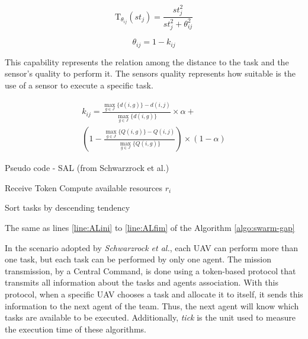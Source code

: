 \begin{equation} \label{eq:tendencia}
	\textrm{T}_{\theta_{ij}}(st_j) = \frac{st_{j}^2}{st_{j}^2 + \theta_{ij}^2}
\end{equation}

\begin{equation} \label{eq:limiar}
	\theta_{ij} = 1 - k_{ij}
\end{equation}

This capability represents the relation among the distance to the task and the sensor's quality to perform it. The sensors quality represents how suitable is the use of a sensor to execute a specific task.

\begin{equation} \label{eq:capability}
\begin{split}
k_{ij} = \frac{\max_{g \in J} \{d(i,g)\} - d(i,j)}{\max_{g \in J} \{d(i,g)\}} \times \alpha + \\
(1 - \frac{\max_{g \in J} \{Q(i,g)\} - Q(i,j)}{\max_{g \in J} \{Q(i,g)\}}) \times (1-\alpha)
\end{split}
\end{equation}

\begin{algorithm}[h!t]
	\caption{Pseudo code - SAL (from Schwarzrock et al.\cite{MAS07})}
	\label{algo:swarm-gap2}
	
	\SetAlgoLined
	\DontPrintSemicolon
	
	\SetNlSkip{0.3em}
	
	Receive Token\;
	Compute available resources $r_i $ \; \label{line:compute_rALA}
	
	Sort tasks by descending tendency\; \label{line:sortbyTend}
	
	
	The same as lines \ref{line:ALini} to \ref{line:ALfim} of the Algorithm \ref{algo:swarm-gap} \;
	
\end{algorithm}

In the scenario adopted by \textit{Schwarzrock et al.}\cite{MAS07}, each UAV can perform more than one task, but each task can be performed by only one agent. The mission transmission, by a Central Command, is done using a token-based protocol that transmits all information about the tasks and agents association. With this protocol, when a specific UAV chooses a task and allocate it to itself, it sends this information to the next agent of the team. Thus, the next agent will know which tasks are available to be executed. Additionally, \textit{tick} is the unit used to measure the execution time of these algorithms.